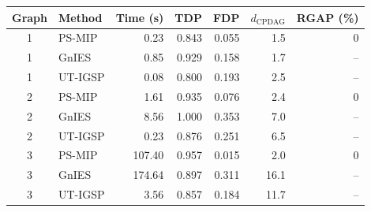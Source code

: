 \begin{tabular}{clrrrrr}
    \hline
    Graph & Method & Time (s) & TDP & FDP &
    \(d_{\mathrm{CPDAG}}\) & RGAP (\%) \\
    \hline
    1 & PS-MIP & 0.23 & 0.843 & 0.055 & 1.5 & 0 \\
    1 & GnIES & 0.85 & 0.929 & 0.158 & 1.7 & -- \\
    1 & UT-IGSP & 0.08 & 0.800 & 0.193 & 2.5 & -- \\
    2 & PS-MIP & 1.61 & 0.935 & 0.076 & 2.4 & 0 \\
    2 & GnIES & 8.56 & 1.000 & 0.353 & 7.0 & -- \\
    2 & UT-IGSP & 0.23 & 0.876 & 0.251 & 6.5 & -- \\
    3 & PS-MIP & 107.40 & 0.957 & 0.015 & 2.0 & 0 \\
    3 & GnIES & 174.64 & 0.897 & 0.311 & 16.1 & -- \\
    3 & UT-IGSP & 3.56 & 0.857 & 0.184 & 11.7 & -- \\
    \hline
\end{tabular}
